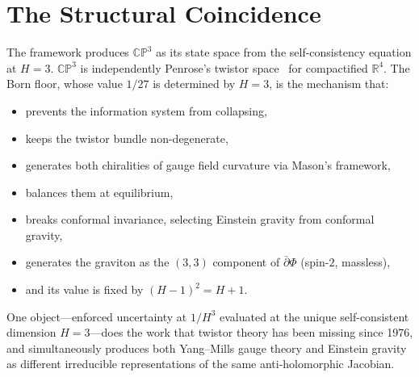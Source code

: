 \documentclass[11pt,a4paper]{article}
\theoremstyle{definition}
\theoremstyle{remark}
\newcommand{\CP}{\mathbb{CP}}
\newcommand{\R}{\mathbb{R}}
\newcommand{\dbar}{\bar{\partial}}
\begin{document}
\section{The Structural Coincidence}\label{sec:coincidence}

The framework produces $\CP^3$ as its state space from the self-consistency equation at $H=3$. $\CP^3$ is independently Penrose's twistor space~\cite{Penrose1967} for compactified $\R^4$. The Born floor, whose value $1/27$ is determined by $H=3$, is the mechanism that:
\begin{itemize}[nosep]
\item prevents the information system from collapsing,
\item keeps the twistor bundle non-degenerate,
\item generates both chiralities of gauge field curvature via Mason's framework,
\item balances them at equilibrium,
\item breaks conformal invariance, selecting Einstein gravity from conformal gravity,
\item generates the graviton as the $(3,3)$ component of $\dbar\Phi$ (spin-$2$, massless),
\item and its value is fixed by $(H-1)^2=H+1$.
\end{itemize}

One object---enforced uncertainty at $1/H^3$ evaluated at the unique self-consistent dimension $H=3$---does the work that twistor theory has been missing since 1976, and simultaneously produces both Yang--Mills gauge theory and Einstein gravity as different irreducible representations of the same anti-holomorphic Jacobian.
\end{document}

